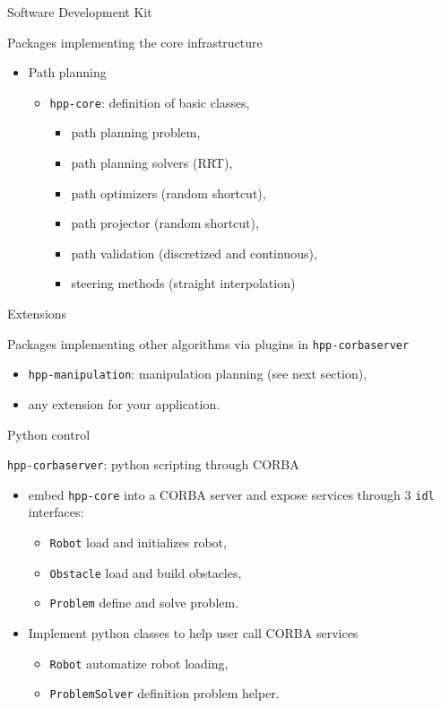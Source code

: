 \begin {frame} {Software Development Kit}

Packages implementing the core infrastructure
\begin{itemize}
\item Path planning
  \begin{itemize}
  \item \texttt{hpp-core}: definition of basic classes,
    \begin{itemize}
      \item path planning problem,
      \item path planning solvers (RRT),
      \item path optimizers (random shortcut),
      \item path projector (random shortcut),
      \item path validation (discretized and continuous),
      \item steering methods (straight interpolation)
    \end{itemize}
  \end{itemize}
\end{itemize}
\end {frame}


\begin {frame} {Extensions}

Packages implementing other algorithms via plugins in \texttt{hpp-corbaserver}
\begin{itemize}
  \item \texttt{hpp-manipulation}: manipulation planning (see next section),
    \pause
  \item any extension for your application.
\end{itemize}
\end {frame}

%
%

\begin {frame} {Python control}

\texttt{hpp-corbaserver}: python scripting through CORBA
\begin{itemize}
\item embed \texttt{hpp-core} into a CORBA server and expose services through 3 \texttt{idl} interfaces:
  \begin{itemize}
  \item \texttt{Robot} load and initializes robot,
  \item \texttt{Obstacle} load and build obstacles,
  \item \texttt{Problem} define and solve problem.
  \end{itemize}
\pause
\item Implement python classes to help user call CORBA services
  \begin{itemize}
    \item \texttt {Robot} automatize robot loading,
    \item \texttt {ProblemSolver} definition problem helper.
  \end{itemize}
\end{itemize}
\end {frame}

